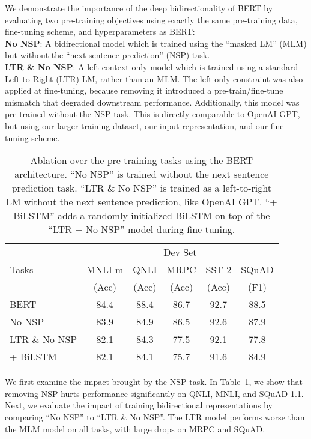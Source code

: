\documentclass[11pt,a4paper]{article}
\newcommand\bertbase{BERT\xspace}
\begin{document}
\label{sec:task_ablation}
We demonstrate the importance of the deep bidirectionality of BERT by evaluating two pre-training objectives using exactly the same pre-training data, fine-tuning scheme, and hyperparameters as \bertbase:
\vspace{0.3cm}
\\
\noindent\textbf{No NSP}: A bidirectional model which is trained using the ``masked LM'' (MLM) but without the ``next sentence prediction'' (NSP) task.\\
\noindent\textbf{LTR \& No NSP}: A left-context-only model which is trained using a standard Left-to-Right (LTR) LM, rather than an MLM. The left-only constraint was also applied at fine-tuning, because  removing it introduced a pre-train/fine-tune mismatch that degraded downstream performance. Additionally, this model was pre-trained without the NSP task. This is directly comparable to OpenAI GPT, but using our larger training dataset, our input representation, and our fine-tuning scheme.
\begin{table}[t]
\small
 \begin{tabular}{@{}lccccc@{}}
    \toprule
              & \multicolumn{5}{c}{Dev Set} \\
   Tasks & MNLI-m & QNLI & MRPC & SST-2 & SQuAD     \\
         & (Acc) & (Acc) & (Acc) & (Acc) & (F1)     \\
     \midrule
\bertbase       & 84.4 & 88.4 & 86.7 & 92.7 & 88.5 \\
No NSP          & 83.9 & 84.9 & 86.5 & 92.6 & 87.9 \\
LTR \& No NSP   & 82.1 & 84.3 & 77.5 & 92.1 & 77.8 \\
\quad + BiLSTM  & 82.1 & 84.1 & 75.7 & 91.6 & 84.9 \\
     \bottomrule
   \end{tabular}
   \caption{Ablation over the pre-training tasks using the \bertbase architecture. ``No NSP'' is trained without the next sentence prediction task. ``LTR \& No NSP'' is trained as a left-to-right LM without the next sentence prediction, like OpenAI GPT. ``+ BiLSTM'' adds a randomly initialized BiLSTM on top of the ``LTR + No NSP'' model during fine-tuning.
   }
   \label{tab:task_ablation}    
\end{table} 
We first examine the impact brought by the NSP task. In Table~\ref{tab:task_ablation}, we show that removing NSP hurts performance significantly on QNLI, MNLI, and SQuAD 1.1. Next, we evaluate the impact of training bidirectional representations by comparing ``No NSP'' to ``LTR \& No NSP''. The LTR model performs worse than the MLM model on all tasks, with large drops on MRPC and SQuAD.
\end{document}
